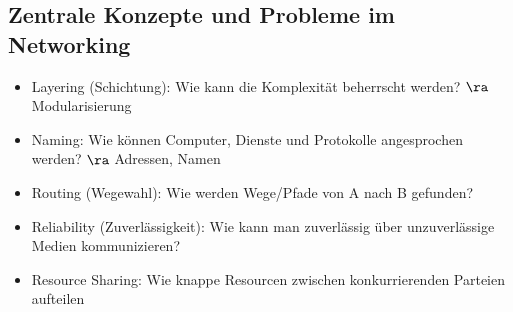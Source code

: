   \subsection{Zentrale Konzepte und Probleme im Networking}
    \begin{itemize}
      \item Layering (Schichtung): Wie kann die Komplexität beherrscht werden? $\ra$ Modularisierung
      \item Naming: Wie können Computer, Dienste und Protokolle angesprochen werden? $\ra$ Adressen,
        Namen
      \item Routing (Wegewahl): Wie werden Wege/Pfade von A nach B gefunden?
      \item Reliability (Zuverlässigkeit): Wie kann man zuverlässig über unzuverlässige Medien
        kommunizieren?
      \item Resource Sharing: Wie knappe Resourcen zwischen konkurrierenden Parteien aufteilen
    \end{itemize}
